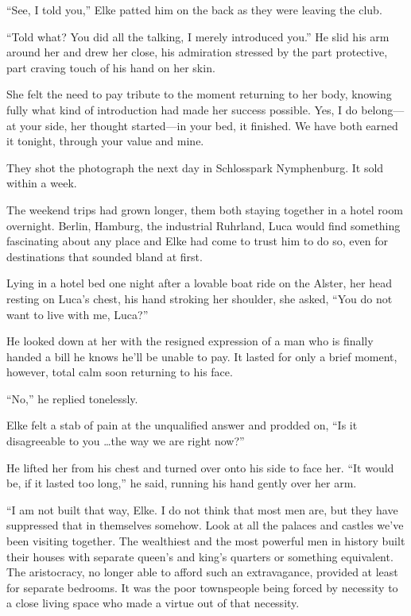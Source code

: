 ``See, I told you,'' Elke patted him on the back as they were leaving the club.

``Told what? You did all the talking, I merely introduced you.'' He slid his arm around her and drew her close, his admiration stressed by the part protective, part craving touch of his hand on her skin.

She felt the need to pay tribute to the moment returning to her body, knowing fully what kind of introduction had made her success possible. Yes, I do belong---at your side, her thought started---in your bed, it finished. We have both earned it tonight, through your value and mine.

They shot the photograph the next day in Schlosspark Nymphenburg. It sold within a week.

\sectionline

The weekend trips had grown longer, them both staying together in a hotel room overnight. Berlin, Hamburg, the industrial Ruhrland, Luca would find something fascinating about any place and Elke had come to trust him to do so, even for destinations that sounded bland at first.

Lying in a hotel bed one night after a lovable boat ride on the Alster, her head resting on Luca's chest, his hand stroking her shoulder, she asked, ``You do not want to live with me, Luca?''

He looked down at her with the resigned expression of a man who is finally handed a bill he knows he'll be unable to pay. It lasted for only a brief moment, however, total calm soon returning to his face.

``No,'' he replied tonelessly.

Elke felt a stab of pain at the unqualified answer and prodded on, ``Is it disagreeable to you \ldots the way we are right now?''

He lifted her from his chest and turned over onto his side to face her. ``It would be, if it lasted too long,'' he said, running his hand gently over her arm.

``I am not built that way, Elke. I do not think that most men are, but they have suppressed that in themselves somehow. Look at all the palaces and castles we've been visiting together. The wealthiest and the most powerful men in history built their houses with separate queen's and king's quarters or something equivalent. The aristocracy, no longer able to afford such an extravagance, provided at least for separate bedrooms. It was the poor townspeople being forced by necessity to a close living space who made a virtue out of that necessity.

